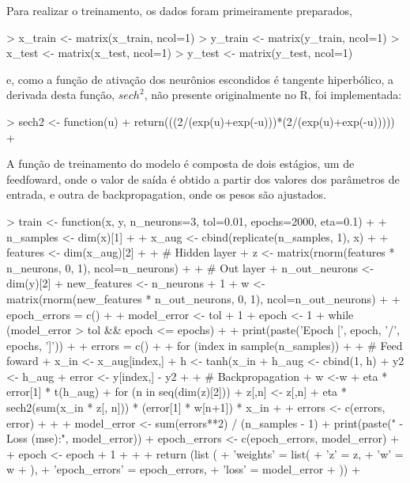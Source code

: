 \documentclass{article}
\begin{document}
Para realizar o treinamento, os dados foram primeiramente preparados,

\begin{Schunk}
\begin{Sinput}
> x_train <- matrix(x_train, ncol=1)
> y_train <- matrix(y_train, ncol=1)
> x_test <- matrix(x_test, ncol=1)
> y_test <- matrix(y_test, ncol=1)
\end{Sinput}
\end{Schunk}

\noindent
e, como a função de ativação dos neurônios escondidos é tangente hiperbólico, a derivada desta função, $sech^2$, não presente originalmente no R, foi implementada:

\begin{Schunk}
\begin{Sinput}
> sech2 <- function(u){
+     return(((2/(exp(u)+exp(-u)))*(2/(exp(u)+exp(-u)))))
+ }
\end{Sinput}
\end{Schunk}

A função de treinamento do modelo é composta de dois estágios, um de feedfoward, onde o valor de saída é obtido a partir dos valores dos parâmetros de entrada, e outra de backpropagation, onde os pesos são ajustados.

\begin{Schunk}
\begin{Sinput}
> train <- function(x, y, n_neurons=3, tol=0.01, epochs=2000, eta=0.1) {
+ 
+     n_samples <- dim(x)[1]
+ 
+     x_aug <- cbind(replicate(n_samples, 1), x)
+ 
+     features <- dim(x_aug)[2]
+ 
+     # Hidden layer
+     z <- matrix(rnorm(features * n_neurons, 0, 1), ncol=n_neurons)
+ 
+     # Out layer
+     n_out_neurons <- dim(y)[2]
+     new_features <- n_neurons + 1
+     w <- matrix(rnorm(new_features * n_out_neurons, 0, 1), ncol=n_out_neurons)
+ 
+     epoch_errors = c()
+ 
+     model_error <- tol + 1
+     epoch <- 1
+     while (model_error > tol && epoch <= epochs) {
+ 
+         print(paste('Epoch [', epoch, '/', epochs, ']'))
+ 
+         errors = c()
+ 
+         for (index in sample(n_samples)) {
+ 
+             # Feed foward
+             x_in <- x_aug[index,]
+             h <- tanh(x_in %*% z)
+             h_aug <- cbind(1, h)
+             y2 <- h_aug %*% w
+             error <- y[index,] - y2
+ 
+             # Backpropagation
+             w <-w + eta * error[1] * t(h_aug)
+             for (n in seq(dim(z)[2])){
+                 z[,n] <- z[,n] + eta * sech2(sum(x_in * z[, n])) * (error[1] * w[n+1]) * x_in
+             }
+             errors <- c(errors, error)
+         }
+ 
+         model_error <- sum(errors**2) / (n_samples - 1)
+         print(paste("  - Loss (mse):", model_error))
+         epoch_errors <- c(epoch_errors, model_error)
+ 
+         epoch <- epoch + 1
+     }
+ 
+     return (list (
+         'weights' = list(
+             'z' = z,
+             'w' = w
+         ),
+         'epoch_errors' = epoch_errors,
+         'loss' = model_error
+     ))
+ }
\end{Sinput}
\end{Schunk}
\end{document}
